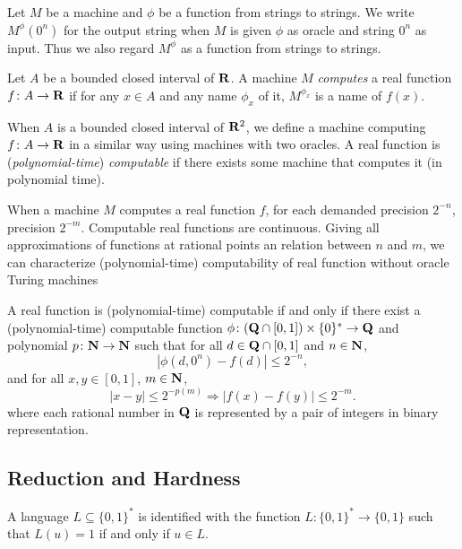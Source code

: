 Let $M$ be a machine and $\phi$ be a function from strings to strings. 
We write $M ^\phi (0 ^n)$ for the output string 
when $M$ is given
$\phi$ as oracle and string $0^n$ as input.
Thus we also regard $M^\phi$ as a function from strings to strings.

\begin{definition}
Let $A$ be a bounded closed interval of $\mathbf R$.
A machine $M$ \emph{computes} a real function $f \colon A \to \mathbf R$ 
if for any $x \in A$ and any name $\phi_x$ of it,
$M^{\phi_x}$ is a name of $f(x)$.
\end{definition}

When $A$ is a bounded closed interval of $\mathbf R ^2$,
we define a machine computing $f \colon A \to \mathbf R$ in a similar way using machines with two oracles.
A real function is (\emph{polynomial-time}) \emph{computable} if there exists some machine that computes it (in polynomial time).

When a machine $M$ computes a real function $f$,
for each demanded precision $2^{-n}$,
 precision $2^{-m}$.
Computable real functions are continuous.
Giving all approximations of functions at rational points an relation between $n$ and $m$,
we can characterize (polynomial-time) computability of real function
without oracle Turing machines

\begin{lemma}
 \label{lem:type1representation}
 A real function is (polynomial-time) computable if and only if
 there exist a (polynomial-time) computable function 
 $\phi \colon (\mathbf Q \cap [0, 1]) \times \{0\} ^* \to \mathbf Q$ and 
 polynomial $p \colon \mathbf N \to \mathbf N$ such that
 for all $d \in \mathbf Q \cap [0,1]$ and $n \in \mathbf N$,
 \begin{equation}
  |\phi(d, 0^n) - f(d)| \le 2^{-n},
 \end{equation}
 and for all $x, y \in [0, 1]$, $m \in \mathbf N$,
 \begin{equation}
  |x-y| \le 2^{-p(m)} \Rightarrow |f(x) - f(y)| \le 2^{-m}.
 \end{equation}
 where each rational number in $\mathbf Q$ is represented by a pair of integers in binary representation.
\end{lemma}

\subsection{Reduction and Hardness}
A language $L \subseteq \{0, 1\} ^*$ is identified with the function
$L \colon \{0, 1\} ^* \to \{0, 1\}$ such that $L (u) = 1$ if and only if $u \in L$.


